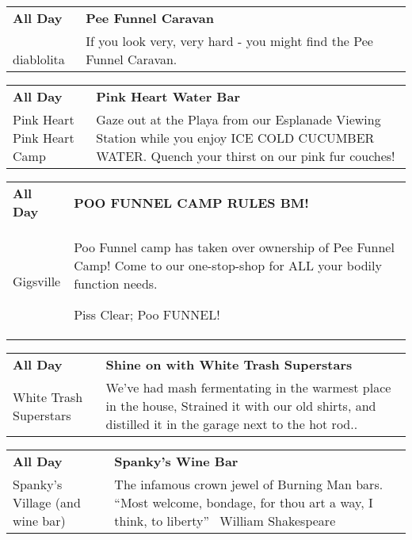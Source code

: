 \begin{tabular}{ p{1in} p{2.2in} }
    \textbf{All Day} & \textbf{Pee Funnel Caravan} \\
    ~ \newline diablolita & If you look very, very hard - you might find the Pee Funnel Caravan. \\
    \hline 
\end{tabular}
    
\begin{tabular}{ p{1in} p{2.2in} }
    \textbf{All Day} & \textbf{Pink Heart Water Bar} \\
    Pink Heart \newline Pink Heart Camp & Gaze out at the Playa from our Esplanade Viewing Station while you enjoy ICE COLD CUCUMBER WATER. Quench your thirst on our pink fur couches! \\
    \hline 
\end{tabular}
    
\begin{tabular}{ p{1in} p{2.2in} }
    \textbf{All Day} & \textbf{POO FUNNEL CAMP RULES BM!} \\
    Gigsville \newline  & Poo Funnel camp has taken over ownership of Pee Funnel Camp! Come to our one-stop-shop for ALL your bodily function needs.

Piss Clear;
Poo FUNNEL! \\
    \hline 
\end{tabular}
    
\begin{tabular}{ p{1in} p{2.2in} }
    \textbf{All Day} & \textbf{Shine on with White Trash Superstars} \\
    White Trash Superstars \newline  & We've had mash fermentating in the warmest place in the house, Strained it with our old shirts, and distilled it in the garage next to the hot rod.. \\
    \hline 
\end{tabular}
    
\begin{tabular}{ p{1in} p{2.2in} }
    \textbf{All Day} & \textbf{Spanky's Wine Bar} \\
    Spanky's Village (and wine bar) \newline  & The infamous crown jewel of Burning Man bars.  ``Most welcome, bondage, for thou art a way, I think, to liberty''  ~William Shakespeare~ \\
    \hline 
\end{tabular}
    

